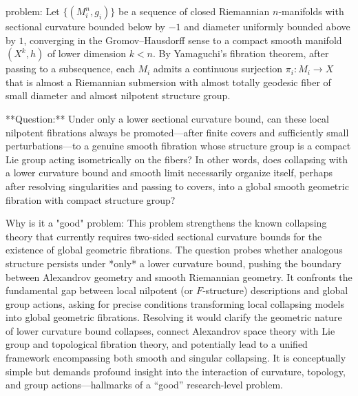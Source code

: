 problem:  
Let $\{(M_i^n,g_i)\}$ be a sequence of closed Riemannian $n$‑manifolds with sectional curvature bounded below by $-1$ and diameter uniformly bounded above by $1$, converging in the Gromov–Hausdorff sense to a compact smooth manifold $(X^k,h)$ of lower dimension $k<n$. By Yamaguchi’s fibration theorem, after passing to a subsequence, each $M_i$ admits a continuous surjection $\pi_i:M_i\to X$ that is almost a Riemannian submersion with almost totally geodesic fiber of small diameter and almost nilpotent structure group.

**Question:**  
Under only a lower sectional curvature bound, can these local nilpotent fibrations always be promoted—after finite covers and sufficiently small perturbations—to a genuine smooth fibration whose structure group is a compact Lie group acting isometrically on the fibers? In other words, does collapsing with a lower curvature bound and smooth limit necessarily organize itself, perhaps after resolving singularities and passing to covers, into a global smooth geometric fibration with compact structure group?

Why is it a "good" problem:  
This problem strengthens the known collapsing theory that currently requires two‑sided sectional curvature bounds for the existence of global geometric fibrations. The question probes whether analogous structure persists under *only* a lower curvature bound, pushing the boundary between Alexandrov geometry and smooth Riemannian geometry. It confronts the fundamental gap between local nilpotent (or $F$‑structure) descriptions and global group actions, asking for precise conditions transforming local collapsing models into global geometric fibrations. Resolving it would clarify the geometric nature of lower curvature bound collapses, connect Alexandrov space theory with Lie group and topological fibration theory, and potentially lead to a unified framework encompassing both smooth and singular collapsing. It is conceptually simple but demands profound insight into the interaction of curvature, topology, and group actions—hallmarks of a “good” research-level problem.